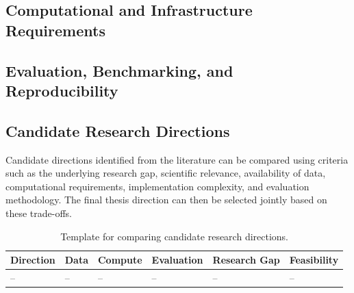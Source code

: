 \documentclass[11pt,a4paper]{article}
\begin{document}

\subsection{Computational and Infrastructure Requirements}


\subsection{Evaluation, Benchmarking, and Reproducibility}


\subsection{Candidate Research Directions}

Candidate directions identified from the literature can be compared using
criteria such as the underlying research gap, scientific relevance,
availability of data, computational requirements, implementation complexity,
and evaluation methodology. The final thesis direction can then be selected
jointly based on these trade-offs.

\begin{table}[htbp]
    \centering
    \small
    \begin{tabular}{
        p{}
        p{}
        p{}
        p{}
        p{}
        p{}}
        \toprule
        \textbf{Direction} &
        \textbf{Data} &
        \textbf{Compute} &
        \textbf{Evaluation} &
        \textbf{Research Gap} &
        \textbf{Feasibility} \\
        \midrule
        -- & -- & -- & -- & -- & -- \\
        \bottomrule
    \end{tabular}
    \caption{Template for comparing candidate research directions.}
    \label{tab:candidate-directions}
\end{table}
\end{document}
